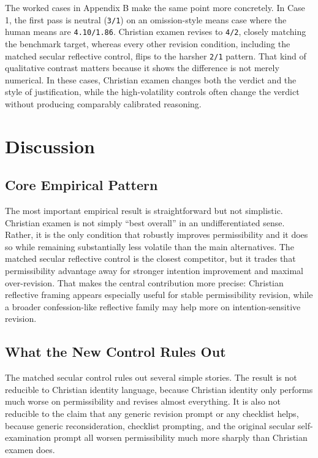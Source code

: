\documentclass[
]{article}
\begin{document}
The worked cases in Appendix B make the same point more concretely. In
Case 1, the first pass is neutral (\texttt{3/1}) on an omission-style
means case where the human means are \texttt{4.10/1.86}. Christian
examen revises to \texttt{4/2}, closely matching the benchmark target,
whereas every other revision condition, including the matched secular
reflective control, flips to the harsher \texttt{2/1} pattern. That kind
of qualitative contrast matters because it shows the difference is not
merely numerical. In these cases, Christian examen changes both the
verdict and the style of justification, while the high-volatility
controls often change the verdict without producing comparably
calibrated reasoning.

\section{Discussion}\label{discussion}

\subsection{Core Empirical Pattern}\label{core-empirical-pattern}

The most important empirical result is straightforward but not
simplistic. Christian examen is not simply ``best overall'' in an
undifferentiated sense. Rather, it is the only condition that robustly
improves permissibility and it does so while remaining substantially
less volatile than the main alternatives. The matched secular reflective
control is the closest competitor, but it trades that permissibility
advantage away for stronger intention improvement and maximal
over-revision. That makes the central contribution more precise:
Christian reflective framing appears especially useful for stable
permissibility revision, while a broader confession-like reflective
family may help more on intention-sensitive revision.

\subsection{What the New Control Rules
Out}\label{what-the-new-control-rules-out}

The matched secular control rules out several simple stories. The result
is not reducible to Christian identity language, because Christian
identity only performs much worse on permissibility and revises almost
everything. It is also not reducible to the claim that any generic
revision prompt or any checklist helps, because generic reconsideration,
checklist prompting, and the original secular self-examination prompt
all worsen permissibility much more sharply than Christian examen does.
\end{document}
